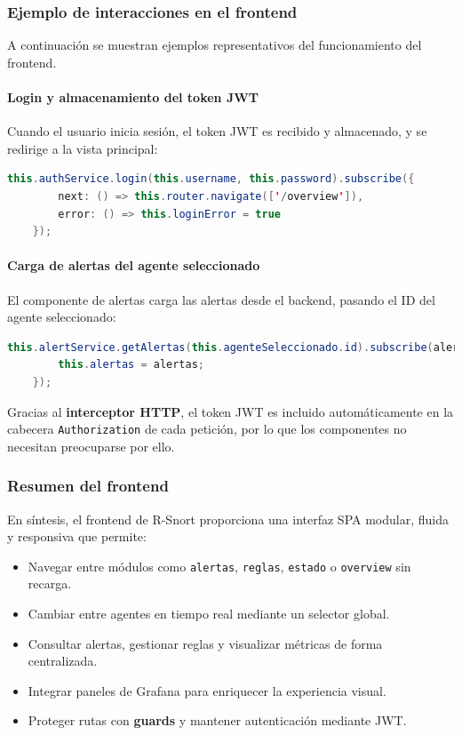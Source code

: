 \documentclass[11pt,a4paper,twoside]{report}
\begin{document}
\subsubsection{Ejemplo de interacciones en el frontend}

A continuación se muestran ejemplos representativos del funcionamiento del frontend.

\paragraph{Login y almacenamiento del token JWT}

Cuando el usuario inicia sesión, el token JWT es recibido y almacenado, y se redirige a la vista principal:

\begin{lstlisting}[language=Java, caption={Login y navegación tras autenticación}, label={lst:frontend-login}]
	this.authService.login(this.username, this.password).subscribe({
		next: () => this.router.navigate(['/overview']),
		error: () => this.loginError = true
	});
\end{lstlisting}

\paragraph{Carga de alertas del agente seleccionado}

El componente de alertas carga las alertas desde el backend, pasando el ID del agente seleccionado:

\begin{lstlisting}[language=Java, caption={Carga de alertas desde el servicio}, label={lst:frontend-alertas}]
	this.alertService.getAlertas(this.agenteSeleccionado.id).subscribe(alertas => {
		this.alertas = alertas;
	});
\end{lstlisting}

Gracias al \textbf{interceptor HTTP}, el token JWT es incluido automáticamente en la cabecera \texttt{Authorization} de cada petición, por lo que los componentes no necesitan preocuparse por ello.

\subsubsection{Resumen del frontend}

En síntesis, el frontend de R-Snort proporciona una interfaz SPA modular, fluida y responsiva que permite:

\begin{itemize}
	\item Navegar entre módulos como \texttt{alertas}, \texttt{reglas}, \texttt{estado} o \texttt{overview} sin recarga.
	\item Cambiar entre agentes en tiempo real mediante un selector global.
	\item Consultar alertas, gestionar reglas y visualizar métricas de forma centralizada.
	\item Integrar paneles de Grafana para enriquecer la experiencia visual.
	\item Proteger rutas con \textbf{guards} y mantener autenticación mediante JWT.
\end{itemize}
\end{document}

